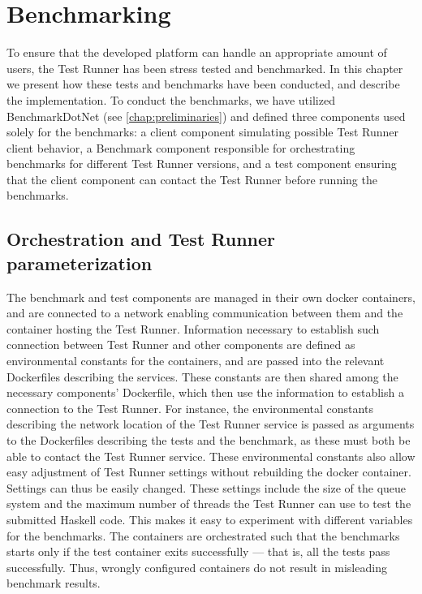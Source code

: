 \chapter{Benchmarking} \label{chap:Benchmarking}
To ensure that the developed platform can handle an appropriate amount of users, the Test Runner has been stress tested and benchmarked.
In this chapter we present how these tests and benchmarks have been conducted, and describe the implementation. To conduct the benchmarks, we have utilized BenchmarkDotNet (see \ref{chap:preliminaries}) and defined three components used solely for the benchmarks:
a client component simulating possible Test Runner client behavior, a Benchmark component responsible for orchestrating benchmarks for different Test Runner versions, and a test component ensuring that the client component can contact the Test Runner before running the benchmarks.

\section{Orchestration and Test Runner parameterization}
The benchmark and test components are managed in their own docker containers, and are connected to a network enabling communication between them and the container hosting the Test Runner. 
Information necessary to establish such connection between Test Runner and other components are defined as environmental constants for the containers, and are passed into the relevant Dockerfiles describing the services.
These constants are then shared among the necessary components' Dockerfile, which then use the information to establish a connection to the Test Runner.
For instance, the environmental constants describing the network location of the Test Runner service is passed as arguments to the Dockerfiles describing the tests and the benchmark, as these must both be able to contact the Test Runner service.
These environmental constants also allow easy adjustment of Test Runner settings without rebuilding the docker container.
Settings can thus be easily changed.
These settings include the size of the queue system and the maximum number of threads the Test Runner can use to test the submitted Haskell code.
This makes it easy to experiment with different variables for the benchmarks.  
The containers are orchestrated such that the benchmarks starts only if the test container exits successfully --- that is, all the tests pass successfully. 
Thus, wrongly configured containers do not result in misleading benchmark results.

